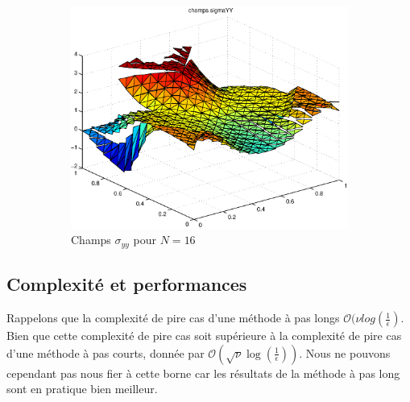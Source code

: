 \begin{figure}[h!]
\begin{subfigure}[b]{0.32\textwidth}
  \includegraphics[width=\textwidth]{images/sigmayyN32.eps}
  \caption{Champs $\sigma_{yy}$ pour $N=16$}
  \end{subfigure}
  \caption{}
  \label{fig:ResultatsChampsSigma}
  
 

  
\end{figure}

\subsection{Complexité et performances}
Rappelons que la complexité de pire cas d'une méthode à pas longs  $\mathcal{O}(\nu log(\frac{1}{\epsilon})$. Bien que cette complexité de pire cas soit supérieure à la complexité de pire cas d'une méthode à pas courts, donnée par $\mathcal{O}(\sqrt{\nu} \log(\frac{1}{\epsilon}))$. Nous ne pouvons cependant pas nous fier à cette borne car les résultats de la méthode à pas long sont en pratique bien meilleur.


